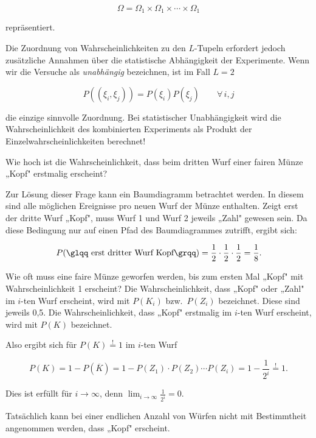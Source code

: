 $$
\Omega = \Omega_1 \times \Omega_1 \times \cdots \times \Omega_1
$$

repräsentiert.

Die Zuordnung von Wahrscheinlichkeiten zu den $L$-Tupeln erfordert jedoch zusätzliche Annahmen über die statistische Abhängigkeit der Experimente. Wenn wir die Versuche als \textit{unabhängig} bezeichnen, ist im Fall $L = 2$

$$
P\left((\xi_i, \xi_j)\right) = P(\xi_i) P(\xi_j) \qquad \forall\, i, j
$$

die einzige sinnvolle Zuordnung. Bei statistischer Unabhängigkeit wird die Wahrscheinlichkeit des kombinierten Experiments als Produkt der Einzelwahrscheinlichkeiten berechnet!

\begin{beispiel}
Wie hoch ist die Wahrscheinlichkeit, dass beim dritten Wurf einer fairen Münze „Kopf" erstmalig erscheint?

Zur Lösung dieser Frage kann ein Baumdiagramm betrachtet werden. In diesem sind alle möglichen Ereignisse pro neuen Wurf der Münze enthalten. Zeigt erst der dritte Wurf „Kopf", muss Wurf 1 und Wurf 2 jeweils „Zahl" gewesen sein. Da diese Bedingung nur auf einen Pfad des Baumdiagrammes zutrifft, ergibt sich:

$$
P(\text{\glqq erst dritter Wurf Kopf\grqq}) = \frac{1}{2} \cdot \frac{1}{2} \cdot \frac{1}{2} = \frac{1}{8}.
$$

\end{beispiel}

\begin{beispiel}
Wie oft muss eine faire Münze geworfen werden, bis zum ersten Mal „Kopf" mit Wahrscheinlichkeit 1 erscheint? Die Wahrscheinlichkeit, dass „Kopf" oder „Zahl" im $i$-ten Wurf erscheint, wird mit $P(K_i)$ bzw.\ $P(Z_i)$ bezeichnet. Diese sind jeweils 0{,}5. Die Wahrscheinlichkeit, dass „Kopf" erstmalig im $i$-ten Wurf erscheint, wird mit $P(K)$ bezeichnet.

Also ergibt sich für $P(K) \stackrel{!}{=} 1$ im $i$-ten Wurf

$$
P(K) = 1 - P(\overline{K}) = 1 - P(Z_1) \cdot P(Z_2) \cdots P(Z_i) = 1 - \frac{1}{2^i} \stackrel{!}{=} 1.
$$

Dies ist erfüllt für $i \to \infty$, denn $\lim_{i \to \infty} \frac{1}{2^i} = 0$.

Tatsächlich kann bei einer endlichen Anzahl von Würfen nicht mit Bestimmtheit angenommen werden, dass „Kopf" erscheint.
\end{beispiel}

